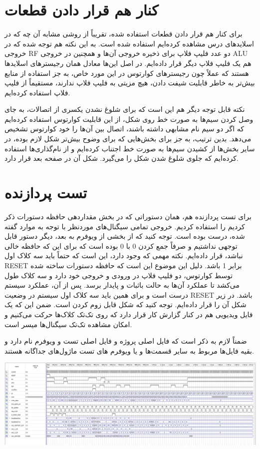 \documentclass[12pt,titlepage,a4page , tikz , multi,table , svgnames,xcdraw]{article}
\begin{document}
\section{کنار هم قرار دادن قطعات}

برای کنار هم قرار دادن قطعات استفاده شده، تقریباً از روشی مشابه آن چه که در اسلایدهای درس مشاهده کرده‌ایم استفاده شده است. به این نکته هم توجه شده که در خروجی RF دو عدد فلیپ فلاپ برای ذخیره خروجی آن‌ها و همچنین در خروجی ALU هم یک فلیپ فلاپ دیگر قرار داده‌ایم. در اصل این‌ها معادل همان رجیسترهای اسلایدها هستند که عملاً چون رجیسترهای کوارتوس در این مورد خاص، به جز استفاده از منابع بیش‌تر به خاطر قابلیت شیفت دادن، هیچ مزیتی به فلیپ فلاپ ندارند، مستقیماً از فلیپ فلاپ استفاده کرده‌ایم.

نکته قابل توجه دیگر هم این است که برای شلوغ نشدن یکسری از اتصالات، به جای وصل کردن سیم‌ها به صورت خط روی شکل، از این قابلیت کوارتوس استفاده کرده‌ایم که اگر دو سیم نام مشابهی داشته باشند، اتصال بین آن‌ها را خود کوارتوس تشخیص می‌دهد. بدین ترتیب، به جز برای بخش‌هایی که برای وضوح بیش‌تر شکل لازم بوده، در سایر بخش‌ها از کشیدن سیم‌ها به صورت خط اجتناب کرده‌ایم و از نام‌گذاری‌ها استفاده کرده‌ایم که جلوی شلوغ شدن شکل را می‌گیرد. شکل آن در صفحه بعد قرار دارد.



\begin{landscape}

\thispagestyle{empty}




\end{landscape}

\section{تست پردازنده}

برای تست پردازنده هم، همان دستوراتی که در بخش مقداردهی حافظه دستورات ذکر کردیم را استفاده کردیم. خروجی تمامی سیگنال‌های موردنظر با توجه به موارد گفته شده، درست بوده است. توجه کنید که از بخشی از ویوفرم به بعد، دیگر دستور قابل توجهی نداشتیم و صرفاً جمع کردن $0$ با $0$ بوده است که برای این که حافظه خالی نباشد، قرار داده‌ایم. نکته مهمی که وجود دارد، این است که حتماً باید سه کلاک اول RESET برابر 1 باشد. دلیل این موضوع این است که حافظه دستورات ساخته شده توسط کوارتوس، دو فلیپ فلاپ در ورودی و خروجی خود دارد و سه کلاک طول می‌کشد تا عملکرد آن‌ها به حالت باثبات و پایدار برسد. پس از آن، عملکرد سیستم درست است و برای همین باید سه کلاک اول سیستم در وضعیت RESET باشد. در زیر شکل آن را قرار داده‌ایم. توجه کنید که شکل قابل زوم کردن است. ضمن این که یک فایل ویدیویی هم در کنار گزارش کار قرار دارد که روی تک‌تک کلاک‌ها حرکت می‌کنیم و امکان مشاهده تک‌تک سیگنال‌ها میسر است.

ضمناً لازم به ذکر است که فایل اصلی پروژه  و فایل اصلی تست و ویوفرم  نام دارد و بقیه فایل‌ها مربوط به سایر قسمت‌ها و یا ویوفرم های تست ماژول‌های جداگانه هستند.


\begin{center}
\includegraphics[width=\textwidth]{Waveform.png}
\end{center}
\end{document}
